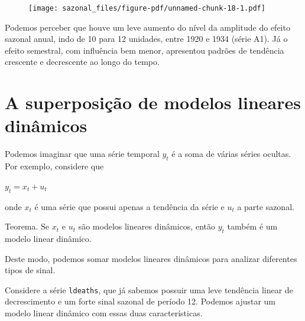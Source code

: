 \documentclass[
  letterpaper,
  DIV=11,
  numbers=noendperiod]{scrreprt}
\newenvironment{Shaded}{\begin{snugshade}}{\end{snugshade}}
\newcommand{\DecValTok}[1]{\textcolor[rgb]{0.68,0.00,0.00}{#1}}
\newcommand{\FunctionTok}[1]{\textcolor[rgb]{0.28,0.35,0.67}{#1}}
\newcommand{\NormalTok}[1]{\textcolor[rgb]{0.00,0.23,0.31}{#1}}
\newcommand{\OtherTok}[1]{\textcolor[rgb]{0.00,0.23,0.31}{#1}}
\newcommand{\SpecialCharTok}[1]{\textcolor[rgb]{0.37,0.37,0.37}{#1}}
\begin{document}
\begin{figure}[H]

{\centering \texttt{[image: sazonal\_files/figure-pdf/unnamed-chunk-18-1.pdf]}

}

\end{figure}

Podemos perceber que houve um leve aumento do nível da amplitude do
efeito sazonal anual, indo de 10 para 12 unidades, entre 1920 e 1934
(série A1). Já o efeito semestral, com influência bem menor, apresentou
padrões de tendência crescente e decrescente ao longo do tempo.

\hypertarget{a-superposiuxe7uxe3o-de-modelos-lineares-dinuxe2micos}{%
\section{A superposição de modelos lineares
dinâmicos}\label{a-superposiuxe7uxe3o-de-modelos-lineares-dinuxe2micos}}

Podemos imaginar que uma série temporal \(y_t\) é a soma de várias
séries ocultas. Por exemplo, considere que

\(y_t=x_t+u_t\)

onde \(x_t\) é uma série que possui apenas a tendência da série e
\(u_t\) a parte sazonal.

Teorema. Se \(x_t\) e \(u_t\) são modelos lineares dinâmicos, então
\(y_t\) também é um modelo linear dinâmico.

Deste modo, podemos somar modelos lineares dinâmicos para analizar
diferentes tipos de sinal.

Considere a série \texttt{ldeaths}, que já sabemos possuir uma leve
tendência linear de decrescimento e um forte sinal sazonal de período
12. Podemos ajustar um modelo linear dinâmico com essas duas
características.

\begin{Shaded}
\end{Shaded}
\end{document}
